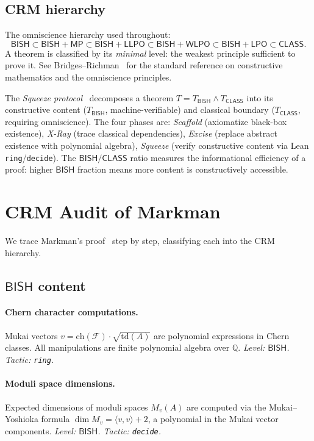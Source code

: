 \documentclass[11pt]{article}
\theoremstyle{plain}
\theoremstyle{definition}
\theoremstyle{remark}
\newcommand{\QQ}{\mathbb{Q}}
\newcommand{\cF}{\mathcal{F}}
\newcommand{\BISH}{\mathsf{BISH}}
\newcommand{\LPO}{\mathsf{LPO}}
\newcommand{\WLPO}{\mathsf{WLPO}}
\newcommand{\LLPO}{\mathsf{LLPO}}
\newcommand{\MP}{\mathsf{MP}}
\newcommand{\CLASS}{\mathsf{CLASS}}
\begin{document}
\subsection{CRM hierarchy}

The omniscience hierarchy used throughout:
\[
  \BISH \subset \BISH + \MP \subset \BISH + \LLPO
  \subset \BISH + \WLPO \subset \BISH + \LPO \subset \CLASS.
\]
A theorem is classified by its \emph{minimal} level: the weakest
principle sufficient to prove it.  See Bridges--Richman~\cite{bridges-richman}
for the standard reference on constructive mathematics and the
omniscience principles.

The \emph{Squeeze protocol}~\cite{p90} decomposes a theorem
$T = T_\BISH \wedge T_\CLASS$ into its constructive content
($T_\BISH$, machine-verifiable) and classical boundary
($T_\CLASS$, requiring omniscience).  The four phases are:
\emph{Scaffold} (axiomatize black-box existence),
\emph{X-Ray} (trace classical dependencies),
\emph{Excise} (replace abstract existence with polynomial algebra),
\emph{Squeeze} (verify constructive content via Lean \texttt{ring}/\texttt{decide}).
The $\BISH/\CLASS$ ratio measures the informational efficiency
of a proof: higher $\BISH$ fraction means more content is
constructively accessible.

\section{CRM Audit of Markman}\label{sec:audit}

We trace Markman's proof~\cite{markman2025} step by step, classifying
each into the CRM hierarchy.

\subsection{$\BISH$ content}

\paragraph{Chern character computations.}
Mukai vectors $v = \mathrm{ch}(\cF) \cdot \sqrt{\mathrm{td}(A)}$ are
polynomial expressions in Chern classes.  All manipulations are
finite polynomial algebra over $\QQ$.  \emph{Level: $\BISH$. Tactic:
\texttt{ring}.}

\paragraph{Moduli space dimensions.}
Expected dimensions of moduli spaces $M_v(A)$ are computed via the
Mukai--Yoshioka formula $\dim M_v = \langle v, v \rangle + 2$, a
polynomial in the Mukai vector components.  \emph{Level: $\BISH$.
Tactic: \texttt{decide}.}
\end{document}
